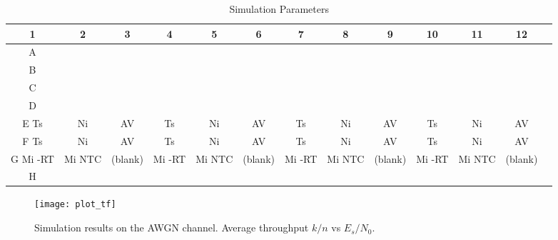 \documentclass[journal, a4paper]{IEEEtran}
\begin{document}
%
    \begin{table}[!hbt]
        \begin{center}
        \caption{Simulation Parameters}
        \label{tab:simParameters}
        \begin{tabular}{|c|c|c|c|c|c|c|c|c|c|c|c|c|}
            \hline
            1 & 2 & 3 & 4 & 5 & 6 & 7 & 8 & 9 & 10 & 11 & 12 \\
            \hline
            A & & & & & & & & & & & \\
            \hline
            B & & & & & & & & & & & \\
            \hline
            C & & & & & & & & & & & \\
            \hline
            D & & & & & & & & & & & \\
            \hline
            E Ts & Ni & AV & Ts & Ni & AV & Ts & Ni & AV & Ts & Ni & AV\\
            \hline
            F Ts & Ni & AV & Ts & Ni & AV & Ts & Ni & AV & Ts & Ni & AV\\
            \hline
            G Mi -RT & Mi NTC & (blank) & Mi -RT & Mi NTC & (blank) & Mi -RT & Mi NTC & (blank) & Mi -RT & Mi NTC & (blank)\\
            \hline
            H & & & & & & & & & & & \\
            \hline


        \end{tabular}
        \end{center}
    \end{table}


    \begin{figure}[!hbt]
        \begin{center}
        \texttt{[image: plot\_tf]}
        \caption{Simulation results on the AWGN channel. Average throughput $k/n$ vs $E_s/N_0$.}
        \label{fig:tf_plot}
        \end{center}
    \end{figure}
\end{document}
